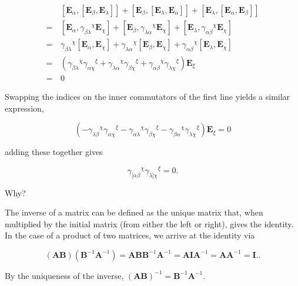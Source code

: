 \documentclass[../the-road-to-reality.tex]{subfiles}
\begin{document}
\begin{questions}
\begin{solution}
        \begin{align*}
                &[\mathbf{E}_\alpha,[\mathbf{E}_\beta,\mathbf{E}_\lambda]] + [\mathbf{E}_\beta,[\mathbf{E}_\lambda,\mathbf{E}_\alpha]] + [\mathbf{E}_\lambda,[\mathbf{E}_\alpha,\mathbf{E}_\beta]] \\
                =\,&[\mathbf{E}_\alpha,{\gamma_{\beta\lambda}}^\chi\mathbf{E}_\chi] + [\mathbf{E}_\beta,{\gamma_{\lambda\alpha}}^\chi\mathbf{E}_\chi] + [\mathbf{E}_\lambda,{\gamma_{\alpha\beta}}^\chi\mathbf{E}_\chi] \\
                =\,&{\gamma_{\beta\lambda}}^\chi[\mathbf{E}_\alpha,\mathbf{E}_\chi] + {\gamma_{\lambda\alpha}}^\chi[\mathbf{E}_\beta,\mathbf{E}_\chi] + {\gamma_{\alpha\beta}}^\chi[\mathbf{E}_\lambda,\mathbf{E}_\chi] \\
                =\,&({\gamma_{\beta\lambda}}^\chi{\gamma_{\alpha\chi}}^\xi + {\gamma_{\lambda\alpha}}^\chi{\gamma_{\beta\chi}}^\xi + {\gamma_{\alpha\beta}}^\chi{\gamma_{\lambda\chi}}^\xi)\mathbf{E}_\xi \\
                =\,&0
        \end{align*}

        Swapping the indices on the inner commutators of the first line yields a similar expression,

        $$(-{\gamma_{\lambda\beta}}^\chi{\gamma_{\alpha\chi}}^\xi - {\gamma_{\alpha\lambda}}^\chi{\gamma_{\beta\chi}}^\xi - {\gamma_{\beta\alpha}}^\chi{\gamma_{\lambda\chi}}^\xi)\mathbf{E}_\xi = 0$$ 

        adding these together gives

	\[
        {\gamma_{[\alpha\beta}}^\chi{\gamma_{\lambda]\chi}}^\xi = 0
	.\] 
\end{solution}

\question Why?

\begin{solution}
        The inverse of a matrix can be defined as the unique matrix that, when multiplied by the initial matrix (from either the left or right), gives the identity. In the case of a product of two matrices, we arrive at the identity via

	\[
		(\mathbf{A}\mathbf{B})(\mathbf{B}^{-1}\mathbf{A}^{-1}) = \mathbf{A}\mathbf{B}\mathbf{B}^{-1}\mathbf{A}^{-1} = \mathbf{A}\mathbf{I}\mathbf{A}^{-1}=\mathbf{A}\mathbf{A}^{-1}=\mathbf{I}.
	.\] 

        By the uniqueness of the inverse, $(\mathbf{AB})^{-1} = \mathbf{B}^{-1}\mathbf{A}^{-1}$.
\end{solution}


\end{questions}
\end{document}

